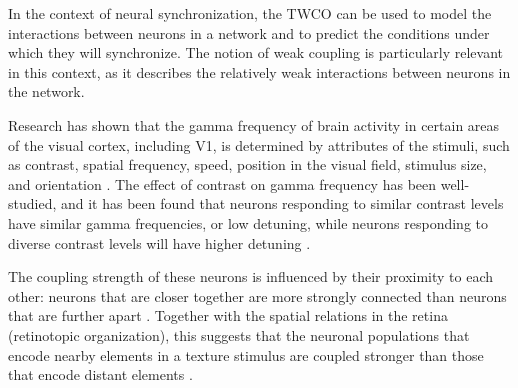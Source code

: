 In the context of neural synchronization, the TWCO can be used to model the interactions between neurons in a network and to predict the conditions under which they will synchronize. The notion of weak coupling is particularly relevant in this context, as it describes the relatively weak interactions between neurons in the network. 

Research has shown that the gamma frequency of brain activity in certain areas of the visual cortex, including V1, is determined by attributes of the stimuli, such as contrast, spatial frequency, speed, position in the visual field, stimulus size, and orientation \cite{Hubel1968, Kennedy1985, Gattass1987, Baldi1990, Whittington2000, Logothetis2001, Henrie2005, Hall2005, Buia2006, Gieselmann2008, Swettenham2009, Feng2010, Whittington2011, Roberts2013, Shapira2017, Dubey2020}. The effect of contrast on gamma frequency has been well-studied, and it has been found that neurons responding to similar contrast levels have similar gamma frequencies, or low detuning, while neurons responding to diverse contrast levels will have higher detuning \cite{Henrie2005, Ray2010, Roberts2013, Lowet2015, Hadjipapas2015, Shapira2017}.

The coupling strength of these neurons is influenced by their proximity to each other: neurons that are closer together are more strongly connected than neurons that are further apart \cite{Gilbert1983, Tso1986a, Stettler2002, Lowet2015, Lowet2017}. Together with the spatial relations in the retina (retinotopic organization), this suggests that the neuronal populations that encode nearby elements in a texture stimulus are coupled stronger than those that encode distant elements \cite{MaryamPLACEHOLDER}.